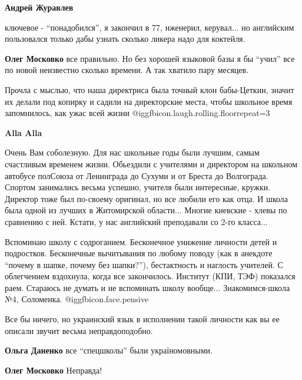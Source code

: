 \begin{itemize}
\begin{itemize}
\textbf{Андрей Журавлев} 

ключевое - \enquote{понадобился}, я закончил в 77, нженерил, керувал... но английским
пользовался только дабы узнать сколько ликера надо для коктейля.


\textbf{Олег Московко} все правильно. Но без хорошей языковой базы я бы \enquote{учил} все по новой неизвестно сколько времени. А так хватило пару месяцев.
\end{itemize} %


Прочла с мыслью, что наша директриса была точный клон бабы-Цеткин, значит их
делали под копирку и садили на директорские места, чтобы школьное время
запомнилось, как ужас всей жизни @igg{fbicon.laugh.rolling.floor}{repeat=3} 

\begin{itemize} %
\textbf{Alla Alla} 

Очень Вам соболезную. Для нас школьные годы были лучшим, самым счастливым
временем жизни. Обьездили с учителями и директором на школьном автобусе
полСоюза от Ленинграда до Сухуми и от Бреста до Волгограда. Спортом занимались
весьма успешно, учителя были интересные, кружки. Директор тоже был по-своему
оригинал, но все любили его как отца. И школа была одной из лучших в
Житомирской области... Многие киевские - хлевы по сравнению с ней. Кстати, у
нас английский преподавали со 2-го класса...


Вспоминаю школу с содроганием. Бесконечное унижение личности детей и
подростков. Бесконечные вычитывания по любому поводу (как в анекдоте \enquote{почему в
шапке, почему без шапки?}), бестактность и наглость учителей. С облегчением
вздохнула, когда все закончилось. Институт (КПИ, ТЭФ) показался раем. Стараюсь не
думать и не вспоминать школу вообще... Знакомимся-школа №4, Соломенка. @igg{fbicon.face.pensive} 

\end{itemize} %


Все бы ничего, но украинский язык в исполнении такой личности как вы ее описали
звучит весьма неправдоподобно.

\begin{itemize} %
\textbf{Ольга Даненко} все \enquote{спецшколы} были україномовными.

\textbf{Олег Московко} Неправда! 


\end{itemize}
\end{itemize}
